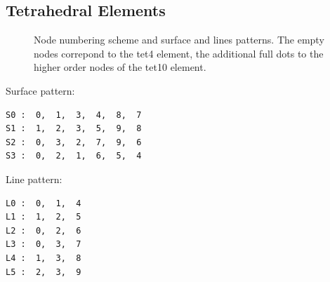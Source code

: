 \newpage
\subsection{Tetrahedral Elements}

\begin{figure}[h!]
\begin{center}
\caption{Node numbering scheme and surface and lines patterns. The empty nodes correpond to the tet4 element, the additional full dots to the higher order nodes of the tet10 element.}
\label{fig:conventions:tet}
\end{center}
\end{figure}

Surface pattern:
\begin{verbatim}
S0 :  0,  1,  3,  4,  8,  7
S1 :  1,  2,  3,  5,  9,  8
S2 :  0,  3,  2,  7,  9,  6
S3 :  0,  2,  1,  6,  5,  4
\end{verbatim}

Line pattern:
\begin{verbatim}
L0 :  0,  1,  4
L1 :  1,  2,  5
L2 :  0,  2,  6
L3 :  0,  3,  7
L4 :  1,  3,  8
L5 :  2,  3,  9
\end{verbatim}





